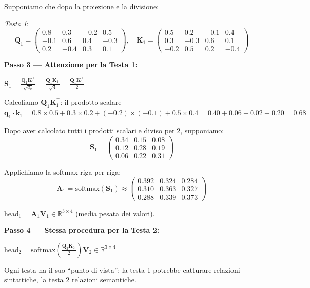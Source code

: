 \documentclass[12pt,a4paper]{article}
\begin{document}
\begin{examplebox}
Supponiamo che dopo la proiezione e la divisione:

\textit{Testa 1}:
\[
\mathbf{Q}_1 = \begin{pmatrix} 0.8 & 0.3 & -0.2 & 0.5 \\ -0.1 & 0.6 & 0.4 & -0.3 \\ 0.2 & -0.4 & 0.3 & 0.1 \end{pmatrix}, \quad \mathbf{K}_1 = \begin{pmatrix} 0.5 & 0.2 & -0.1 & 0.4 \\ 0.3 & -0.3 & 0.6 & 0.1 \\ -0.2 & 0.5 & 0.2 & -0.4 \end{pmatrix}
\]

\textbf{Passo 3 --- Attenzione per la Testa 1:}

$\mathbf{S}_1 = \frac{\mathbf{Q}_1 \mathbf{K}_1^\top}{\sqrt{d_k}} = \frac{\mathbf{Q}_1 \mathbf{K}_1^\top}{\sqrt{4}} = \frac{\mathbf{Q}_1 \mathbf{K}_1^\top}{2}$

Calcoliamo $\mathbf{Q}_1 \mathbf{K}_1^\top$: il prodotto scalare $\mathbf{q}_1 \cdot \mathbf{k}_1 = 0.8 \times 0.5 + 0.3 \times 0.2 + (-0.2) \times (-0.1) + 0.5 \times 0.4 = 0.40 + 0.06 + 0.02 + 0.20 = 0.68$

Dopo aver calcolato tutti i prodotti scalari e diviso per 2, supponiamo:
\[
\mathbf{S}_1 = \begin{pmatrix} 0.34 & 0.15 & 0.08 \\ 0.12 & 0.28 & 0.19 \\ 0.06 & 0.22 & 0.31 \end{pmatrix}
\]

Applichiamo la softmax riga per riga:
\[
\mathbf{A}_1 = \text{softmax}(\mathbf{S}_1) \approx \begin{pmatrix} 0.392 & 0.324 & 0.284 \\ 0.310 & 0.363 & 0.327 \\ 0.288 & 0.339 & 0.373 \end{pmatrix}
\]

$\text{head}_1 = \mathbf{A}_1 \mathbf{V}_1 \in \mathbb{R}^{3 \times 4}$ (media pesata dei valori).

\textbf{Passo 4 --- Stessa procedura per la Testa 2:}

$\text{head}_2 = \text{softmax}\!\left(\frac{\mathbf{Q}_2 \mathbf{K}_2^\top}{2}\right) \mathbf{V}_2 \in \mathbb{R}^{3 \times 4}$

Ogni testa ha il suo ``punto di vista'': la testa 1 potrebbe catturare relazioni sintattiche, la testa 2 relazioni semantiche.


\end{examplebox}
\end{document}
